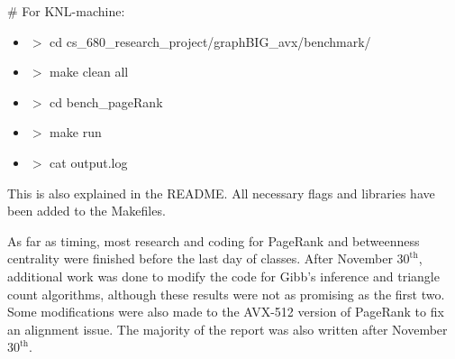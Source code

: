 \documentclass[conference]{IEEEtran}
\begin{document}
\# For KNL-machine:
\begin{itemize}
\item $>$ cd cs\_680\_research\_project/graphBIG\_avx/benchmark/
\item $>$ make clean all
\item $>$ cd bench\_pageRank
\item $>$ make run
\item $>$ cat output.log
\end{itemize}


This is also explained in the README.  All necessary flags and libraries have been added to the Makefiles.  

As far as timing, most research and coding for PageRank and betweenness centrality were finished before the last day of classes.  After November $30^{\text{th}}$, additional work was done to modify the code for Gibb's inference and triangle count algorithms, although these results were not as promising as the first two.  Some modifications were also made to the AVX-512 version of PageRank to fix an alignment issue.  The majority of the report was also written after November $30^{\text{th}}$.  







%
%
\end{document}
